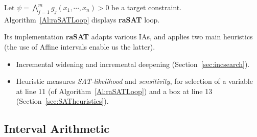 \documentclass[runningheads,a4paper,oribibl]{llncs}
\newcommand{\suppress}[1]{} %
\begin{document}
Let $\psi = \bigwedge\limits_{j=1}^mg_j(x_1, \cdots, x_n) > 0$ be a target constraint. 
Algorithm~\ref{Al:raSATLoop} displays {\bf raSAT} loop. 

%
Its implementation {\bf raSAT} adapts various IAs,
and applies two main heuristics (the use of Affine intervals enable us the latter).
\begin{itemize}
\item Incremental widening and incremental deepening (Section~\ref{sec:incsearch}). 
\item 
Heuristic measures {\em SAT-likelihood} and {\em sensitivity}, 
for selection of a variable at line 11 (of Algorithm~\ref{Al:raSATLoop}) and
a box at line 13 (Section~\ref{sec:SATheuristics}). 
\end{itemize} 



\subsection{Interval Arithmetic} \label{sec:approximation}

\suppress{A typical theory for $O.T$ and $U.T$ are an IA and testing, respectively. 
We say {\em IA-valid}, {\em IA-SAT}, and {\em IA-UNSAT}, when it is $O.T$-valid, $O.T$-SAT, and 
$O.T$-UNSAT, respectively. 
Similarly, we say {\em test-SAT} when it is $U.T$-SAT and {\em test-UNSAT} when $U.T$-UNSAT. 
Note that either IA-valid or test-SAT implies SAT, and IA-UNSAT implies UNSAT, 
whereas IA-SAT and test-UNSAT can conclude neither.} 
\end{document}
